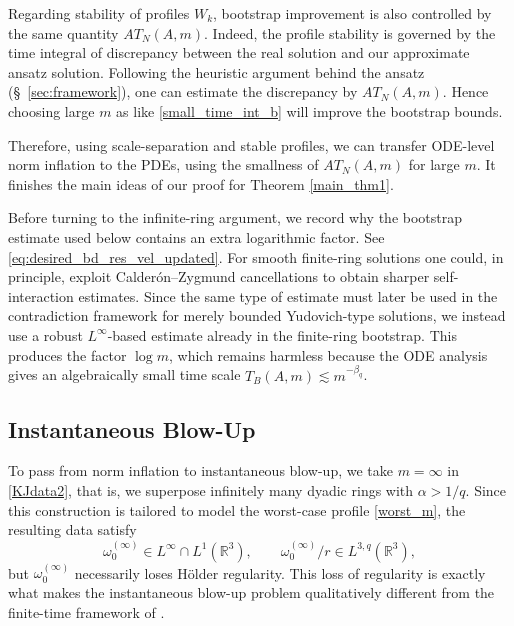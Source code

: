 \documentclass[reqno,11pt]{amsart}
\begin{document}
Regarding stability of profiles $W_k$,  bootstrap improvement is also controlled by the same quantity $AT_N(A,m)$. 
Indeed, the profile stability is governed by the time integral of discrepancy between the real solution and our approximate ansatz solution. Following the heuristic argument behind the ansatz (\S~\ref{sec:framework}), one can estimate the discrepancy by $AT_N(A,m)$.
Hence choosing large $m$ as like \eqref{small_time_int_b} will improve the bootstrap bounds. 


Therefore, using scale-separation and stable profiles, we can transfer ODE-level norm inflation to the PDEs, using the smallness of $AT_N(A,m)$ for large $m$.
It finishes the main ideas of our proof for Theorem \ref{main_thm1}.

Before turning to the infinite-ring argument, we record why the bootstrap estimate used below contains an extra logarithmic factor. See \eqref{eq:desired_bd_res_vel_updated}. For smooth finite-ring solutions one could, in principle, exploit Calderón--Zygmund cancellations to obtain sharper self-interaction estimates. Since the same type of estimate must later be used in the contradiction framework for merely bounded Yudovich-type solutions, we instead use a robust \(L^\infty\)-based estimate already in the finite-ring bootstrap. This produces the factor \(\log m\), which remains harmless because the ODE analysis gives an algebraically small time scale \(T_B(A,m)\lesssim m^{-\beta_q}\).


\subsection{Instantaneous Blow-Up}
\label{subsec:instant_blow-up}

To pass from norm inflation to instantaneous blow-up, we take $m=\infty$ in \eqref{KJdata2}, that is, we superpose infinitely many dyadic rings with $\alpha > 1/q$. Since this construction is tailored to model the worst-case profile \eqref{worst_m}, the resulting data satisfy
\[
\omega_0^{(\infty)} \in L^\infty \cap L^1(\mathbb R^3),
\qquad 
\omega_0^{(\infty)}/r \in L^{3,q}(\mathbb R^3),
\]
but $\omega_0^{(\infty)}$ necessarily loses Hölder regularity. This loss of regularity is exactly what makes the instantaneous blow-up problem qualitatively different from the finite-time framework of \cite{CordobaMartinezZheng25}.

\medskip
\end{document}
